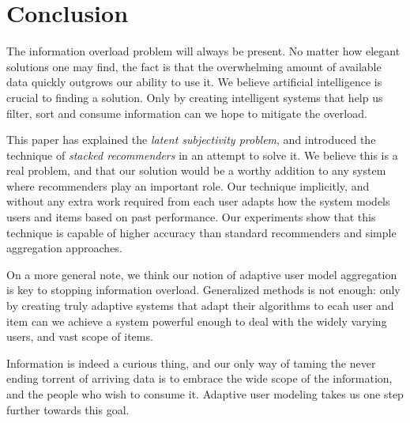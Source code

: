 \section{Conclusion}

The information overload problem will always be present.
No matter how elegant solutions one may find,
the fact is that the overwhelming amount of available data
quickly outgrows our ability to use it.
We believe artificial intelligence is crucial to finding a solution.
Only by creating intelligent systems that 
help us filter, sort and consume information can we hope 
to mitigate the overload.

This paper has explained the \emph{latent subjectivity problem},
and introduced the technique of \emph{stacked recommenders}
in an attempt to solve it.
We believe this is a real problem,
and that our solution would be a worthy addition to
any system where recommenders play an important role.
Our technique implicitly, and without any extra work required from each user
adapts how the system models users and items based on past performance.
Our experiments show that this technique is capable of higher accuracy
than standard recommenders and simple aggregation approaches.

On a more general note, we think our notion of adaptive user model
aggregation is key to stopping information overload.
Generalized methods is not enough: only
by creating truly adaptive systems that adapt their
algorithms to ecah user and item can we achieve a 
system powerful enough to deal with the widely
varying users, and vast scope of items.

Information is indeed a curious thing,
and our only way of taming the never ending torrent of 
arriving data is to embrace the wide scope of the information,
and the people who wish to consume it.
Adaptive user modeling takes us one step further towards this goal.


